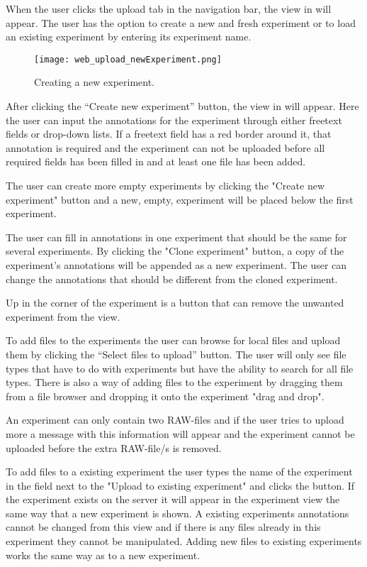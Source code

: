 When the user clicks the upload tab in the navigation bar, the view in  will appear. The user has the option to create a new and fresh experiment or to load an existing experiment by entering its experiment name. 
\begin{figure}[h]
\centering
\texttt{[image: web\_upload\_newExperiment.png]}
\caption{\label{fig:web_upload_newExperiment}Creating a new experiment.}
\end{figure}

After clicking the “Create new experiment” button, the view in  will appear. Here the user can input the annotations for the experiment through either freetext fields or drop-down lists. If a freetext field has a red border around it, that annotation is required and the experiment can not be uploaded before all required fields has been filled in and at least one file has been added.

The user can create more empty experiments by clicking the "Create new experiment" button and a new, empty, experiment will be placed below the first experiment.

The user can fill in annotations in one experiment that should be the same for several experiments. By clicking the "Clone experiment" button, a copy of the experiment's annotations will be appended as a new experiment. The user can change the annotations that should be different from the cloned experiment.

Up in the corner of the experiment is a button that can remove the unwanted experiment from the view. 

To add files to the experiments the user can browse for local files and upload them by clicking the “Select files to upload” button. The user will only see file types that have to do with experiments but have the ability to search for all file types. There is also a way of adding files to the experiment by dragging them from a file browser and dropping it onto the experiment "drag and drop".

An experiment can only contain two RAW-files and if the user tries to upload more a message with this information will appear and the experiment cannot be uploaded before the extra RAW-file/s is removed. 

To add files to a existing experiment the user types the name of the experiment in the field next to the "Upload to existing experiment" and clicks the button. If the experiment exists on the server it will appear in the experiment view the same way that a new experiment is shown. A existing experiments annotations cannot be changed from this view and if there is any files already in this experiment they cannot be manipulated. Adding new files to existing experiments works the same way as to a new experiment.


